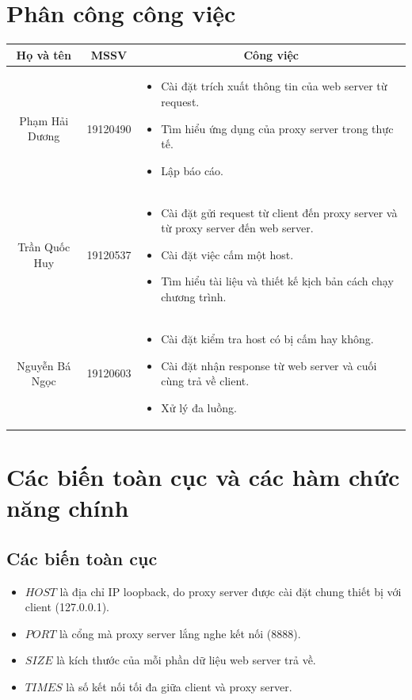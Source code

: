\documentclass[12pt,a4paper]{article}
\begin{document}
	\section{Phân công công việc}
		\begin{table}[h]
			\begin{tabularx}{\textwidth}{|c|c|X|}
			\hline
			\rowcolor[HTML]{FFDAAE}
			Họ và tên & MSSV & \multicolumn{1}{c|}{\cellcolor[HTML]{FFDAAE}Công việc}                                                                                                                                                                  \\ \hline
			Phạm Hải Dương & 19120490 &
				\begin{itemize}
					\item Cài đặt trích xuất thông tin của web server từ request.
					\item Tìm hiểu ứng dụng của proxy server trong thực tế.
					\item Lập báo cáo.
				\end{itemize}
				\\ \hline
			Trần Quốc Huy & 19120537 & 
				\begin{itemize}
					\item Cài đặt gửi request từ client đến proxy server và từ proxy server đến web server.
					\item Cài đặt việc cấm một host.
					\item Tìm hiểu tài liệu và thiết kế kịch bản cách chạy chương trình.
				\end{itemize}
				 \\ \hline
			Nguyễn Bá Ngọc & 19120603 &
				\begin{itemize}
					\item Cài đặt kiểm tra host có bị cấm hay không.
					\item Cài đặt nhận response từ web server và cuối cùng trả về client.
					\item Xử lý đa luồng.
				\end{itemize}
				\\ \hline
			\end{tabularx}
	\end{table}
	\section{Các biến toàn cục và các hàm chức năng chính}
		\subsection{Các biến toàn cục}
			\begin{itemize}
				\item $HOST$ là địa chỉ IP loopback, do proxy server được cài đặt chung thiết bị với client (127.0.0.1).
				\item $PORT$ là cổng mà proxy server lắng nghe kết nối (8888).
				\item $SIZE$ là kích thước của mỗi phần dữ liệu web server trả về.
				\item $TIMES$ là số kết nối tối đa giữa client và proxy server.
			\end{itemize}
\end{document}
